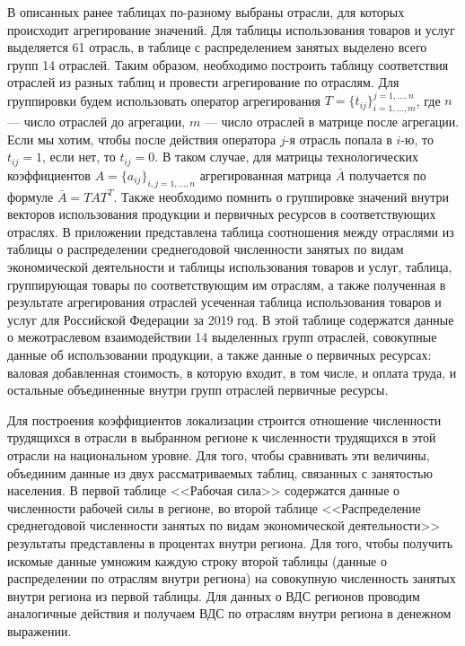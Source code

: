 \documentclass[12pt, a4paper]{article}
\begin{document}
В описанных ранее таблицах по-разному выбраны отрасли, для которых происходит агрегирование значений. Для таблицы использования товаров и услуг выделяется 61 отрасль, в таблице с распределением занятых выделено всего групп 14 отраслей. Таким образом, необходимо построить таблицу соответствия отраслей из разных таблиц и провести агрегирование по отраслям. Для группировки будем использовать оператор агрегирования $T = \{t_{ij}\}_{i = 1, \ldots, m}^{j = 1, \ldots, n}$, где $n$ --- число отраслей до агрегации, $m$ --- число отраслей в матрице после агрегации. Если мы хотим, чтобы после действия оператора $j$-я отрасль попала в $i$-ю, то $t_{ij} = 1$, если нет, то $t_{ij} = 0$. В таком случае, для матрицы технологических коэффициентов $A = \{a_{ij}\}_{i, j = 1, \ldots, n}$ агрегированная матрица $\bar{A}$ получается по формуле $\bar{A} = T A T^T.$ Также необходимо помнить о группировке значений внутри векторов использования продукции и первичных ресурсов в соответствующих отраслях. В приложении представлена таблица соотношения между отраслями из таблицы о распределении среднегодовой численности занятых по видам экономической деятельности и таблицы использования товаров и услуг, таблица, группирующая товары по соответствующим им отраслям, а также полученная в результате агрегирования отраслей усеченная таблица использования товаров и услуг для Российской Федерации за 2019 год. В этой таблице содержатся данные о межотраслевом взаимодействии 14 выделенных групп отраслей, совокупные данные об использовании продукции, а также данные о первичных ресурсах: валовая добавленная стоимость, в которую входит, в том числе, и оплата труда, и остальные объединенные внутри групп отраслей первичные ресурсы.

Для построения коэффициентов локализации строится отношение численности трудящихся в отрасли в выбранном регионе к численности трудящихся в этой отрасли на национальном уровне. Для того, чтобы сравнивать эти величины, объединим данные из двух рассматриваемых таблиц, связанных с занятостью населения. В первой таблице <<Рабочая сила>> содержатся данные о численности рабочей силы в регионе, во второй таблице <<Распределение среднегодовой численности занятых по видам экономической деятельности>> результаты представлены в процентах внутри региона. Для того, чтобы получить искомые данные умножим каждую строку второй таблицы (данные о распределении по отраслям внутри региона) на совокупную численность занятых внутри региона из первой таблицы.
Для данных о ВДС регионов проводим аналогичные действия и получаем ВДС по отраслям внутри региона в денежном выражении.
\end{document}
